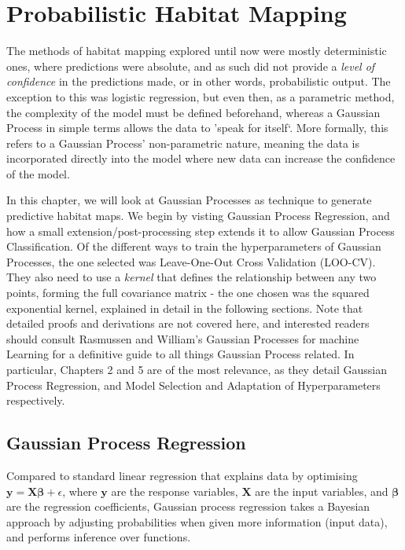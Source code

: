 \chapter{Probabilistic Habitat Mapping} \label{chap:gps}

The methods of habitat mapping explored until now were mostly deterministic ones, where predictions were absolute, and as such did not provide a \textit{level of confidence} in the predictions made, or in other words, probabilistic output. The exception to this was logistic regression, but even then, as a parametric method, the complexity of the model must be defined beforehand, whereas a Gaussian Process in simple terms allows the data to 'speak for itself`. More formally, this refers to a Gaussian Process' non-parametric nature, meaning the data is incorporated directly into the model where new data can increase the confidence of the model.

In this chapter, we will look at Gaussian Processes as technique to generate predictive habitat maps. We begin by visting Gaussian Process Regression, and how a small extension/post-processing step extends it to allow Gaussian Process Classification. Of the different ways to train the hyperparameters of Gaussian Processes, the one selected was Leave-One-Out Cross Validation (LOO-CV). They also need to use a \textit{kernel} that defines the relationship between any two points, forming the full covariance matrix - the one chosen was the squared exponential kernel, explained in detail in the following sections. Note that detailed proofs and derivations are not covered here, and interested readers should consult Rasmussen and William's Gaussian Processes for machine Learning \cite{rasmussen06} for a definitive guide to all things Gaussian Process related. In particular, Chapters 2 and 5 are of the most relevance, as they detail Gaussian Process Regression, and Model Selection and Adaptation of Hyperparameters respectively.


\section{Gaussian Process Regression}

Compared to standard linear regression that explains data by optimising $\mathbf{y=X\beta} + \epsilon$, where $\mathbf{y}$ are the response variables, $\mathbf{X}$ are the input variables, and $\mathbf{\beta}$ are the regression coefficients, Gaussian process regression takes a Bayesian approach by adjusting probabilities when given more information (input data), and performs inference over functions.

